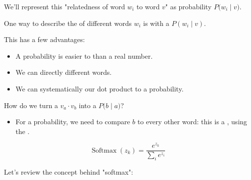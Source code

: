         We'll represent this "relatedness of word $w_i$ to word $v$" as probability $P\big(w_i \mid v\big)$.\\

        \begin{concept}
            One way to describe the  of different words $w_i$ is with a  \phantom{fillertext} $P(w_i \mid v) $.

            This has a few advantages:

            \begin{itemize}
                \item A probability is easier to  than a real number.

                \item We can directly  different words.

                \item We can systematically  our dot product to a probability.
            \end{itemize}
        \end{concept}


        How do we turn a  $v_a \cdot v_b$ into a  $P\big(b \mid a\big)$? 

        \begin{itemize}
            \item For a probability, we need to compare $b$ to every other word: this is a , using the .
        \end{itemize}

        \begin{equation}
            \operatorname{Softmax}(z_k) = \frac{e^{z_k}}{ \sum_i e^{z_i}}
        \end{equation}

        Let's review the concept behind "softmax":\\


